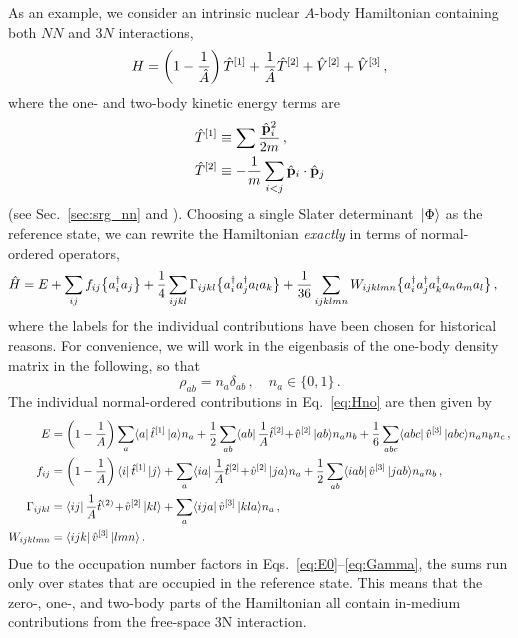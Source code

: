 {As an example, we consider an intrinsic nuclear $A$-body Hamiltonian 
containing both $NN$ and $3N$ interactions,
\begin{equation}\label{eq:def_Hint}
  H = \left(1-\frac{1}{\AO}\right)\TO^{[1]} + \frac{1}{\AO}\TO^{[2]} + \VO^{[2]} +\VO^{[3]}\,,
\end{equation}
where the one- and two-body kinetic energy terms are
\begin{align}
  \hat{T}^{[1]} &\equiv \sum\frac{\hat{\mathbf{p}}^2_i}{2m}\,,\\
  \hat{T}^{[2]} &\equiv -\frac{1}{m}\sum_{i<j}\hat{\mathbf{p}}_i\cdot\hat{\mathbf{p}}_j
\end{align}
(see Sec.~\ref{sec:srg_nn} and \cite{Hergert:2009wh}). Choosing a 
single Slater determinant $\,|{\Phi}\rangle$ as the reference state, we can 
rewrite the Hamiltonian \emph{exactly} in terms of normal-ordered operators,
\begin{align}\label{eq:Hno}
  \HO &= E + \sum_{ij}f_{ij}\nord{\aaO_{i}\aO_{j}} + \frac{1}{4}\sum_{ijkl}\Gamma_{ijkl}\nord{\aaO_{i}\aaO_{j}\aO_{l}\aO_{k}}
    + \frac{1}{36}\sum_{ijklmn}W_{ijklmn}\nord{\aaO_{i}\aaO_{j}\aaO_{k}\aO_{n}\aO_{m}\aO_{l}}\,,
\end{align}
where the labels for the individual contributions have been chosen for 
historical reasons. For convenience, we will work in the eigenbasis of 
the one-body density matrix in the following, so that
\begin{equation}\label{eq:def_natorb}
  \rho_{ab}=n_{a}\delta_{ab}\,,\quad n_{a}\in\{0,1\}\,.
\end{equation}
The individual normal-ordered contributions in Eq.~\eqref{eq:Hno} are then 
given by
\begin{align}
  E &= \left(1-\frac{1}{A}\right)\sum_{a}\matrixe{a}{\tO^{[1]}}{a}n_{a}
      + \frac{1}{2}\sum_{ab}\matrixe{ab}{\frac{1}{A}\tO^{[2]}\!+\!\vO^{[2]}}{ab}n_{a}n_{b}
      + \frac{1}{6}\sum_{abc}\matrixe{abc}{\vO^{[3]}}{abc}n_{a}n_{b}n_{c}\,,\label{eq:E0}\\
%
  f_{ij} &= \left(1-\frac{1}{A}\right)\matrixe{i}{\tO^{[1]}}{j} 
      + \sum_{a}\matrixe{ia}{\frac{1}{A}\tO^{[2]}\!+\!\vO^{[2]}}{ja}n_{a}
      + \frac{1}{2}\sum_{ab}\matrixe{iab}{\vO^{[3]}}{jab}n_{a}n_{b}\,,\label{eq:f}   
      \\
% 
  \Gamma_{ijkl} &= \matrixe{ij}{\frac{1}{A}\tO^{(2)}\!+\!\vO^{[2]}}{kl} + \sum_{a}\matrixe{ija}{\vO^{[3]}}{kla}n_{a}\,,\label{eq:Gamma}\\
  W_{ijklmn}&=\matrixe{ijk}{\vO^{[3]}}{lmn}\,.
\end{align}
Due to the occupation number factors in Eqs.~\eqref{eq:E0}--\eqref{eq:Gamma}, the sums 
run only over states that are occupied in the reference state. This means that the 
zero-, one-, and two-body parts of the Hamiltonian all contain in-medium contributions 
from the free-space 3N interaction.

}
